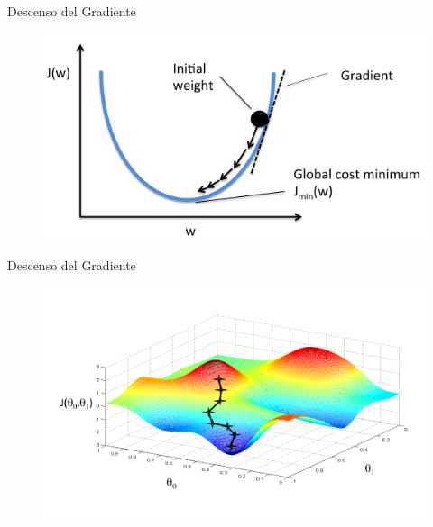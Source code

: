 \documentclass[handout]{beamer}
\begin{document}
\begin{frame}{Descenso del Gradiente}
\begin{figure}[htb]
	\centering
	 \includegraphics[scale=0.15]{imagenes/sgd.png}
\end{figure}



\end{frame}

\begin{frame}{Descenso del Gradiente}
\begin{figure}[htb]
	\centering
	 \includegraphics[scale=0.4]{imagenes/gradientdescent2.png}
\end{figure}



\end{frame}
\end{document}
